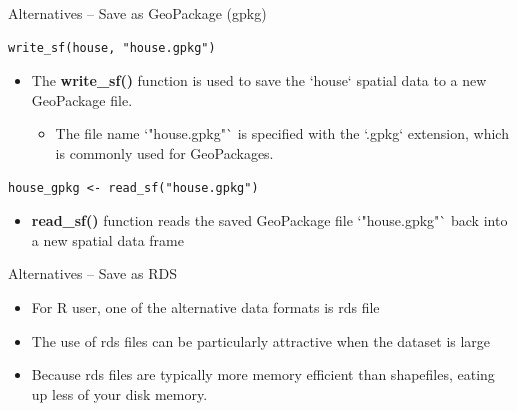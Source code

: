 \documentclass[dvipsnames,hyperref={pdfpagelabels=false}]{beamer}
\begin{document}
\begin{frame}[fragile]{Alternatives -- Save as GeoPackage (gpkg)}
\begin{lstlisting}
write_sf(house, "house.gpkg")
\end{lstlisting}
\begin{itemize}
	\item The \textbf{write\_sf()} function is used to save the `house` spatial data to a new GeoPackage file.
	\vspace{0.2cm}
	\begin{itemize}
		\item The file name `"house.gpkg"` is specified with the `.gpkg` extension, which is commonly used for GeoPackages.
	\end{itemize}
\end{itemize}

\begin{lstlisting}
house_gpkg <- read_sf("house.gpkg")
\end{lstlisting}
\begin{itemize}
	\item \textbf{read\_sf()} function reads the saved GeoPackage file `"house.gpkg"` back into a new spatial data frame
\end{itemize}
\end{frame}





\begin{frame}[fragile]{Alternatives -- Save as RDS}
	\begin{itemize}
		
		\item For R user, one of the alternative data formats  is  rds file
		\vspace{0.2cm}
		\item The use of rds files can be particularly attractive when the dataset is large 
		\vspace{0.2cm}
		\item Because rds files are typically more memory efficient than shapefiles, eating up less of your disk memory.
		
		
	\end{itemize}
\end{frame}
\end{document}
